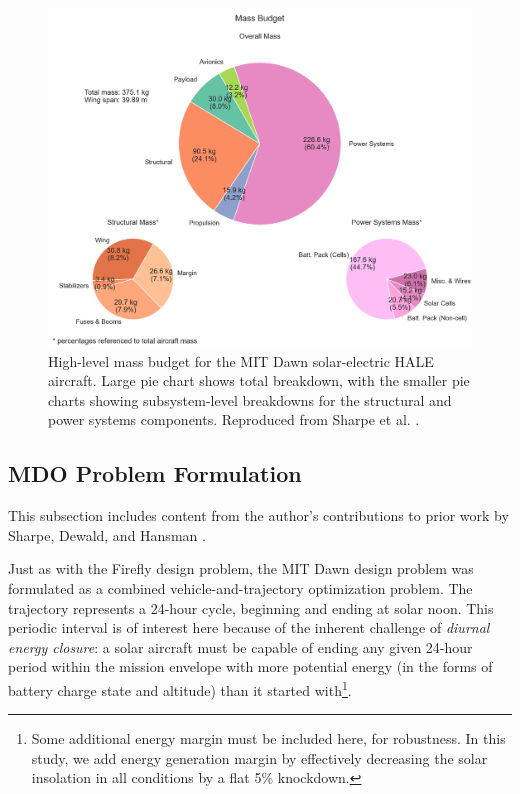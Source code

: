 \begin{figure}[h]
    \centering
    \includegraphics[width=\textwidth]{../figures/dawnfigures/Mass_breakdown_baseline.png}
    \caption{High-level mass budget for the MIT Dawn solar-electric HALE aircraft. Large pie chart shows total breakdown, with the smaller pie charts showing subsystem-level breakdowns for the structural and power systems components. Reproduced from Sharpe et al. \cite{sharpe_optimization_2021}.}
    \label{fig:dawn_mass_budget}
\end{figure}

\subsection{MDO Problem Formulation}
\label{sec:dawn-mdo}

\begin{attrib}
    This subsection includes content from the author's contributions to prior work by Sharpe, Dewald, and Hansman \cite{sharpe_optimization_2021}.
\end{attrib}

Just as with the Firefly design problem, the MIT Dawn design problem was formulated as a combined vehicle-and-trajectory optimization problem. The trajectory represents a 24-hour cycle, beginning and ending at solar noon. This periodic interval is of interest here because of the inherent challenge of \emph{diurnal energy closure}: a solar aircraft must be capable of ending any given 24-hour period within the mission envelope with more potential energy (in the forms of battery charge state and altitude) than it started with\footnote{Some additional energy margin must be included here, for robustness. In this study, we add energy generation margin by effectively decreasing the solar insolation in all conditions by a flat 5\% knockdown.}.

